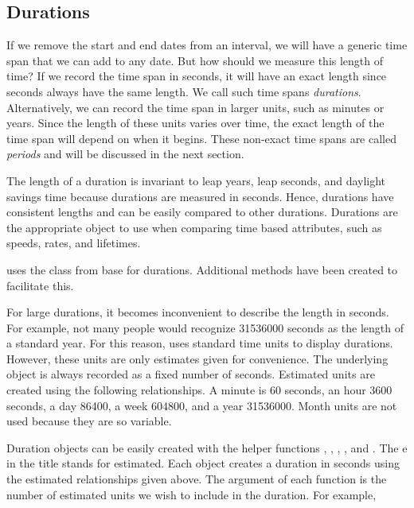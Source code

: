 \documentclass[article]{jss}
\begin{document}
\subsection{Durations}
\label{sec:durations}

If we remove the start and end dates from an interval, we will have a generic time span that we can add to any date. But how should we measure this length of time? If we record the time span in seconds, it will have an exact length since seconds always have the same length. We call such time spans \emph{durations}. Alternatively, we can record the time span in larger units, such as minutes or years. Since the length of these units varies over time, the exact length of the time span will depend on when it begins. These non-exact time spans are called \emph{periods} and will be discussed in the next section.

The length of a duration is invariant to leap years, leap seconds, and daylight savings time because durations are measured in seconds. Hence, durations have consistent lengths and can be easily compared to other durations. Durations are the appropriate object to use when comparing time based attributes, such as speeds, rates, and lifetimes.

 uses the  class from base  for durations. Additional  methods have been created to facilitate this. 

For large durations, it becomes inconvenient to describe the length in seconds. For example, not many people would recognize 31536000 seconds as the length of a standard year. For this reason,  uses standard time units to display durations. However, these units are only estimates given for convenience. The underlying object is always recorded as a fixed number of seconds. Estimated units are created using the following relationships. A minute is 60 seconds, an hour 3600 seconds, a day 86400, a week 604800, and a year 31536000. Month units are not used because they are so variable.

Duration objects can be easily created with the helper functions 
, , , , and  . The e in the title stands for estimated. Each object creates a duration in seconds using the estimated relationships given above. The argument of each function is the number of estimated units we wish to include in the duration. For example,\\
\end{document}
